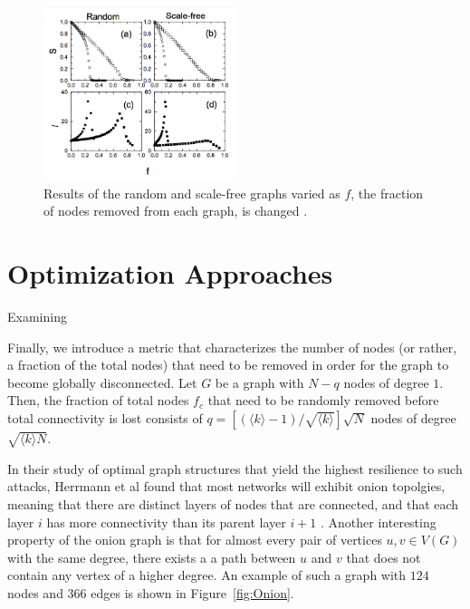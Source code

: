 \documentclass[11pt]{article}
\begin{document}
\begin{figure}[h!]
	\label{fig:RandomResults}
	\centering
		\includegraphics[width=0.5\textwidth]{random_results.png}
	\caption{Results of the random and scale-free graphs varied as $f$, the fraction of nodes removed from each graph, is changed \cite{GraphThesis}. }
\end{figure}


\section{Optimization Approaches}

Examining 

Finally, we introduce a metric that characterizes the number of nodes (or rather, a fraction of the total nodes) that need to be removed in order for the graph to become globally disconnected. Let $G$ be a graph with $N - q$ nodes of degree $1$. Then, the fraction of total nodes $f_c$ that need to be randomly removed before total connectivity is lost consists of $q = [(\langle k \rangle - 1) / \sqrt{\langle k \rangle}]\sqrt{N}$ nodes of degree $\sqrt{\langle k \rangle N}$. 



In their study of optimal graph structures that yield the highest resilience to such attacks, Herrmann et al found that most networks will exhibit onion topolgies, meaning that there are distinct layers of nodes that are connected, and that each layer $i$ has more connectivity than its parent layer $i+1$ \cite{Onion}. Another interesting property of the onion graph is that for almost every pair of vertices $u, v \in V(G)$ with the same degree, there exists a a path between $u$ and $v$ that does not contain any vertex of a higher degree. An example of such a graph with $124$ nodes and $366$ edges is shown in Figure~\ref{fig:Onion}.
\end{document}
